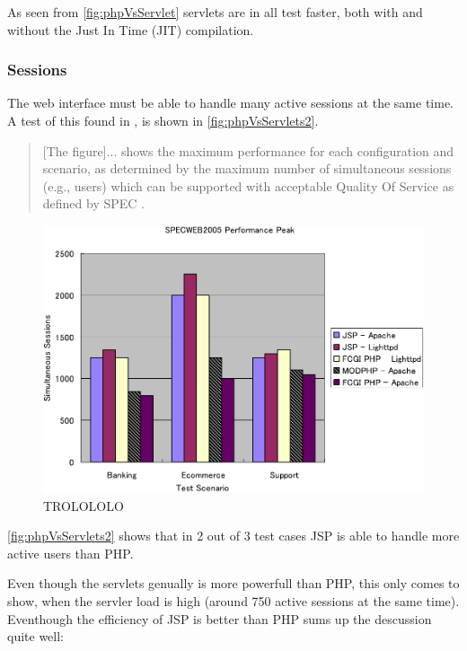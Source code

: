 As seen from \autoref{fig:phpVsServlet} servlets are in all test faster, both with and without the Just In Time (JIT) compilation.

\subsubsection*{Sessions}
The web interface must be able to handle many active sessions at the same time. A test of this found in \cite[p. 173]{servletVsPHP}, is shown in \autoref{fig:phpVsServlets2}.

\begin{quotation}
[The figure]... shows the maximum performance for each configuration and scenario, as
determined by the maximum number of simultaneous sessions (e.g., users) which can
be supported with acceptable Quality Of Service as defined by SPEC \cite[p. 173]{servletVsPHP}.
\end{quotation}

\begin{figure}[htbp]
	\centering
		\includegraphics[width=1.00\textwidth]{images/phpVsServlets2.png}
	\caption{TROLOLOLO}
	\label{fig:phpVsServlets2}
\end{figure}

\autoref{fig:phpVsServlets2} shows that in 2 out of 3 test cases JSP is able to handle more active users than PHP.

Even though the servlets genually is more powerfull than PHP, this only comes to show, when the servler load is high (around 750 active sessions at the same time). Eventhough the efficiency of JSP is better than PHP \cite{servletVsPHP} sums up the descussion quite well:

